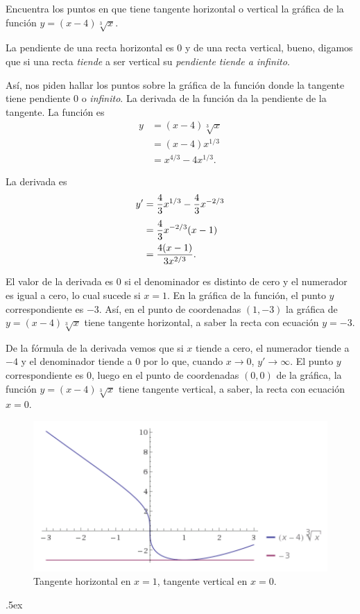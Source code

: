 \documentclass[12pt,letterpaper]{article}
\author{\textsc{Manuel López Mateos}}
\newcommand{\fej}{\relax\hfill\ifmmode{\lower.5ex\hbox{{\textcolor{blue}{\LARGE\smiley al 15pt}}}}\else\lower.5ex\hbox{{\textcolor{blue}{\LARGE \smiley}}}}  %
\begin{document}
\noindent Encuentra los puntos en que tiene tangente horizontal o vertical la gráfica de la función $y=(x-4)\sqrt[3]x$.

\medskip
La pendiente de una recta horizontal es $0$ y de una recta vertical, bueno, digamos que si una recta \emph{tiende} a ser vertical su \emph{pendiente tiende a infinito}.

\medskip
Así, nos piden hallar los puntos sobre la gráfica de la función donde la tangente tiene pendiente $0$ o \emph{infinito}. La derivada de la función da la pendiente de la tangente. La función es
\begin{align*}
y&=(x-4)\sqrt[3]x\\
&=(x-4)x^{1/3}\\
&=x^{4/3}-4x^{1/3}.
\end{align*}

La derivada es
\begin{align*}
y'&=\frac{4}{3}x^{1/3}-\frac{4}{3}x^{-2/3}\\
\noalign{\smallskip}
&=\frac{4}{3}x^{-2/3}(x-1)\\
&=\frac{4(x-1)}{3x^{2/3}}.
\end{align*}

El valor de la derivada es $0$ si el denominador es distinto de cero y el numerador es igual a cero, lo cual sucede si $x=1$. En la gráfica de la función, el punto $y$ correspondiente es $-3$. Así, en el punto de coordenadas $(1,-3)$ la gráfica de $y=(x-4)\sqrt[3]x$ tiene tangente horizontal, a saber la recta con ecuación $y=-3$.

De la fórmula de la derivada vemos que si $x$ tiende a cero, el numerador tiende a $-4$ y el denominador tiende a $0$ por lo que, cuando $x\to 0$, $y'\to \infty$. El punto $y$ correspondiente es $0$, luego en el punto de coordenadas $(0,0)$ de la gráfica, la función $y=(x-4)\sqrt[3]x$ tiene tangente vertical, a saber, la recta con ecuación $x=0$.

\begin{figure}[h]
\begin{center}
\includegraphics[scale=0.6]{img/6.fighorizontalesyverticales.pdf}
\caption{\small Tangente horizontal en $x=1$, tangente vertical en $x=0$.}
\end{center}
\end{figure}

\fej
\end{document}

